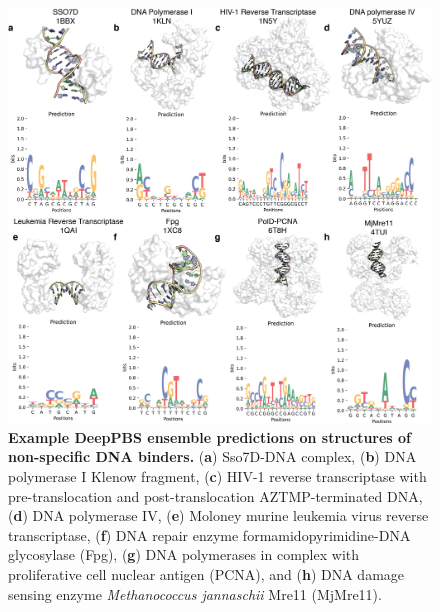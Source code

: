 \begin{center}
\begin{figure}[H]
  \includegraphics[width=\linewidth]{./pdnafigs/figS8.png}
    \caption[Example DeepPBS ensemble predictions on structures of non-specific DNA binders.]{\textbf{Example DeepPBS ensemble predictions on structures of non-specific DNA binders.} ({\bf a}) Sso7D-DNA complex,
({\bf b}) DNA polymerase I Klenow fragment,  ({\bf c}) HIV-1 reverse transcriptase with pre-translocation and post-translocation AZTMP-terminated DNA,  ({\bf d}) DNA polymerase IV,  ({\bf e}) Moloney murine leukemia virus reverse transcriptase,  ({\bf f}) DNA repair enzyme formamidopyrimidine-DNA glycosylase (Fpg),  ({\bf g}) DNA polymerases in complex with proliferative cell nuclear antigen (PCNA), and  ({\bf h}) DNA damage sensing enzyme \textit{Methanococcus jannaschii} Mre11 (MjMre11).}
  \label{fig:pdnaS8}
\end{figure}
\end{center}

